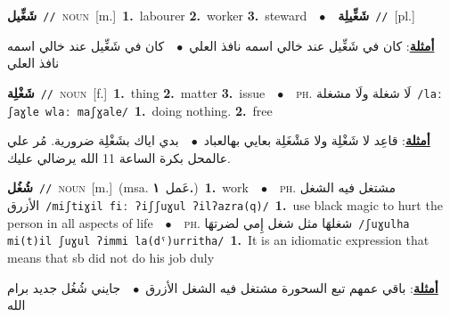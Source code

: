 \documentclass[10pt,a4paper,twoside]{article} %
\begin{document}
\begin{multicols}{2}
{\setlength\topsep{0pt}\textbf{\foreignlanguage{arabic}{شَغِّيل}}\ {\color{gray}\texttt{//}\color{black}}\ \textsc{noun}\ [m.]\ \textbf{1.}~labourer  \textbf{2.}~worker  \textbf{3.}~steward\ \ $\bullet$\ \ \setlength\topsep{0pt}\textbf{\foreignlanguage{arabic}{شَغِّيلِة}}\ {\color{gray}\texttt{//}\color{black}}\ [pl.]\  \begin{flushright}\color{gray}\foreignlanguage{arabic}{\textbf{\underline{\foreignlanguage{arabic}{أمثلة}}}: كان في شَغِّيل عند خالي اسمه نافذ العلي\ $\bullet$\ \  كان في شَغِّيل عند خالي اسمه نافذ العلي}\end{flushright}\color{black}} \vspace{2mm}

{\setlength\topsep{0pt}\textbf{\foreignlanguage{arabic}{شَغْلِة}}\ {\color{gray}\texttt{//}\color{black}}\ \textsc{noun}\ [f.]\ \textbf{1.}~thing  \textbf{2.}~matter  \textbf{3.}~issue\ \ $\bullet$\ \ \textsc{ph.} \color{gray} \foreignlanguage{arabic}{لَا شغلة ولَا مشغلة}\color{black}\ {\color{gray}\texttt{/{\sffamily laː ʃaɣle wlaː maʃɣale}/}\color{black}}\ \textbf{1.}~doing nothing.  \textbf{2.}~free\  \begin{flushright}\color{gray}\foreignlanguage{arabic}{\textbf{\underline{\foreignlanguage{arabic}{أمثلة}}}: قاعِد لا شَغْلِة ولا مَشْغَلِة بعايي بهالعباد\ $\bullet$\ \  بدي اياك بشَغْلِة ضرورية. مُر علي عالمحل بكرة الساعة 11 الله يرضالي عليك.}\end{flushright}\color{black}} \vspace{2mm}

{\setlength\topsep{0pt}\textbf{\foreignlanguage{arabic}{شُغُل}}\ {\color{gray}\texttt{//}\color{black}}\ \textsc{noun}\ [m.]\ \color{gray}(msa. \foreignlanguage{arabic}{عَمل}~\foreignlanguage{arabic}{\textbf{١.}})\color{black}\ \textbf{1.}~work\ \ $\bullet$\ \ \textsc{ph.} \color{gray} \foreignlanguage{arabic}{مشتغل فيه الشغل الأزرق}\color{black}\ {\color{gray}\texttt{/{\sffamily miʃtiɣil fiː ʔiʃʃuɣul ʔilʔazra(q)}/}\color{black}}\ \textbf{1.}~use black magic to hurt the person in all aspects of life\ \ $\bullet$\ \ \textsc{ph.} \color{gray} \foreignlanguage{arabic}{شغلهَا مثل شغل إِمي لضرتهَا}\color{black}\ {\color{gray}\texttt{/{\sffamily ʃuɣulha mi(t)il ʃuɣul ʔimmi la(dˤ)urritha}/}\color{black}}\ \textbf{1.}~It is an idiomatic expression that means that sb did not do his job duly\  \begin{flushright}\color{gray}\foreignlanguage{arabic}{\textbf{\underline{\foreignlanguage{arabic}{أمثلة}}}: باقي عمهم تبع السحورة مشتغل فيه الشغل الأزرق\ $\bullet$\ \  جايني شُغُل جديد برام الله}\end{flushright}\color{black}} \vspace{2mm}


\end{multicols}
\end{document}
